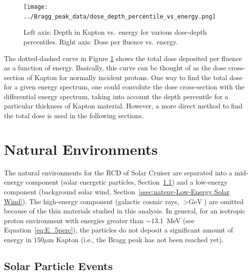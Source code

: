\documentclass{hitec}
\begin{document}
\begin{figure}[htbp!]
	\centering
	\texttt{[image: ../Bragg\_peak\_data/dose\_depth\_percentile\_vs\_energy.png]}
	\caption{Left axis: Depth in Kapton vs.\ energy for various dose-depth percentiles. Right axis: Dose per fluence vs.\ energy.}\label{fig:dose_depth_percentile_vs_energy}
\end{figure}


The dotted-dashed curve in Figure \ref{fig:dose_depth_percentile_vs_energy} shows the total dose deposited per fluence as a function of energy. Basically, this curve can be thought of as the dose cross-section of Kapton for normally incident protons. One way to find the total dose for a given energy spectrum, one could convolute the dose cross-section with the differential energy spectrum, taking into account the depth percentile for a particular thickness of Kapton material. However, a more direct method to find the total dose is used in the following sections.

\section{Natural Environments}
\label{sec:Natural Environment}

The natural environments for the RCD of Solar Cruiser are separated into a mid-energy component (solar energetic particles, Section~\ref{ssec:natenv-Solar Particle Events}) and a low-energy component (background solar wind, Section~\ref{ssec:natenv-Low-Energy Solar Wind}). The high-energy component (galactic cosmic rays, $> \text{GeV}$) are omitted because of the thin materials studied in this analysis. In general, for an isotropic proton environment with energies greater than $\sim 13.1$~MeV (see Equation~\eqref{eq:E_5perc}), the particles do not deposit a significant amount of energy in $150 \mu$m Kapton (i.e., the Bragg peak has not been reached yet).


\subsection{Solar Particle Events}
\label{ssec:natenv-Solar Particle Events}
\end{document}
